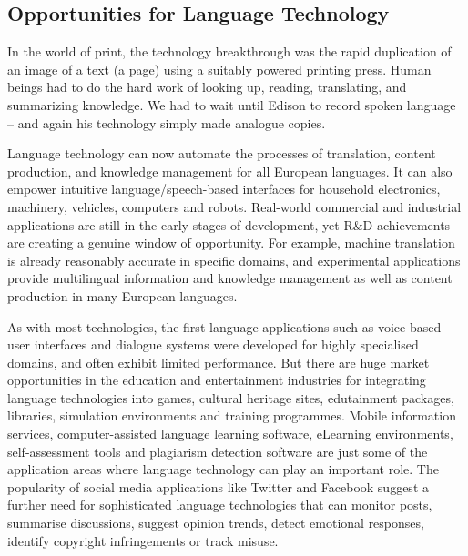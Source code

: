 \begin{multicols}{2}
\subsection{Opportunities for Language Technology}

In the world of print, the technology breakthrough was the rapid duplication of an image of a text (a page) using a suitably powered printing press. Human beings had to do the hard work of looking up, reading, translating, and summarizing knowledge. We had to wait until Edison to record spoken language – and again his technology simply made analogue copies.

Language technology can now automate the processes of translation, content production, and knowledge management for all European languages. It can also empower intuitive language/speech-based interfaces for household electronics, machinery, vehicles, computers and robots. Real-world commercial and industrial applications are still in the early stages of development, yet R\&D achievements are creating a genuine window of opportunity. For example, machine translation is already reasonably accurate in specific domains, and experimental applications provide multilingual information and knowledge management as well as content production in many European languages.

As with most technologies, the first language applications such as voice-based user interfaces and dialogue systems were developed for highly specialised domains, and often exhibit limited performance. But there are huge market opportunities in the education and entertainment industries for integrating language technologies into games, cultural heritage sites, edutainment packages, libraries, simulation environments and training programmes. Mobile information services, computer-assisted language learning software, eLearning environments, self-assessment tools and plagiarism detection software are just some of the application areas where language technology can play an important role. The popularity of social media applications like Twitter and Facebook suggest a further need for sophisticated language technologies that can monitor posts, summarise discussions, suggest opinion trends, detect emotional responses, identify copyright infringements or track misuse.



\end{multicols}
